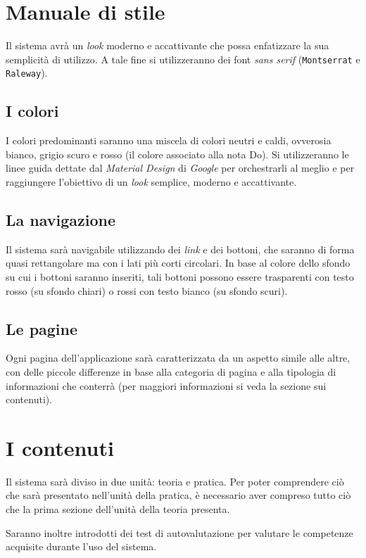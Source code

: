 \section{Manuale di stile}
Il sistema avrà un \emph{look} moderno e accattivante che possa enfatizzare la sua semplicità di utilizzo. A tale fine si utilizzeranno dei font \emph{sans serif} (\texttt{Montserrat} e \texttt{Raleway}).

\subsection{I colori}
I colori predominanti saranno una miscela di colori neutri e caldi, ovverosia bianco, grigio scuro e rosso (il colore associato alla nota Do). Si utilizzeranno le linee guida dettate dal \emph{Material Design} di \emph{Google} per orchestrarli al meglio e per raggiungere l'obiettivo di un \emph{look} semplice, moderno e accattivante.

\subsection{La navigazione}
Il sistema sarà navigabile utilizzando dei \emph{link} e dei bottoni, che saranno di forma quasi rettangolare ma con i lati più corti circolari. In base al colore dello sfondo su cui i bottoni saranno inseriti, tali bottoni possono essere trasparenti con testo rosso (su sfondo chiari) o rossi con testo bianco (su sfondo scuri).

\subsection{Le pagine} 
Ogni pagina dell'applicazione sarà caratterizzata da un aspetto simile alle altre, con delle piccole differenze in base alla categoria di pagina e alla tipologia di informazioni che conterrà (per maggiori informazioni si veda la sezione sui contenuti).

\section{I contenuti}
Il sistema sarà diviso in due unità: teoria e pratica. Per poter comprendere ciò che sarà presentato nell'unità della pratica, è necessario aver compreso tutto ciò che la prima sezione dell'unità della teoria presenta.

Saranno inoltre introdotti dei test di autovalutazione per valutare le competenze acquisite durante l'uso del sistema.

